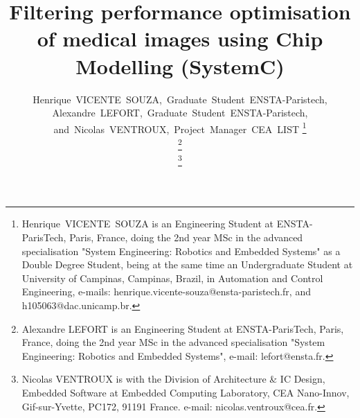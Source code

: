 \documentclass[journal]{IEEEtran}
\begin{document}
%
\title{Filtering performance optimisation of medical images using Chip Modelling (SystemC)}
%
%
%


\author{Henrique~VICENTE~SOUZA,~Graduate~Student~ENSTA-Paristech,\\%
        Alexandre~LEFORT,~Graduate~Student~ENSTA-Paristech,
        and~Nicolas~VENTROUX,~Project~Manager~CEA~LIST%
\thanks{Henrique~VICENTE~SOUZA is an Engineering Student at ENSTA-ParisTech, Paris, France, doing the 2nd year MSc in the advanced specialisation "System Engineering: Robotics and Embedded Systems" as a Double Degree Student, being at the same time an Undergraduate Student at University of Campinas, Campinas, Brazil, in Automation and Control Engineering, e-mails: henrique.vicente-souza@ensta-paristech.fr, and h105063@dac.unicamp.br.}

\thanks{Alexandre LEFORT is an Engineering Student at ENSTA-ParisTech, Paris, France, doing the 2nd year MSc in the advanced specialisation "System Engineering: Robotics and Embedded Systems", e-mail: lefort@ensta.fr.}
        
\thanks{Nicolas VENTROUX is with the Division of Architecture & IC Design,
Embedded Software at Embedded Computing Laboratory, CEA Nano-Innov, Gif-sur-Yvette,
PC172, 91191 France. e-mail: nicolas.ventroux@cea.fr.}}%
\end{document}
